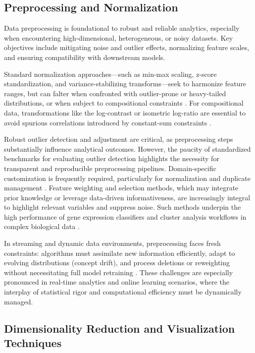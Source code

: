 \subsection{Preprocessing and Normalization}

Data preprocessing is foundational to robust and reliable analytics, especially when encountering high-dimensional, heterogeneous, or noisy datasets. Key objectives include mitigating noise and outlier effects, normalizing feature scales, and ensuring compatibility with downstream models.

Standard normalization approaches—such as min-max scaling, z-score standardization, and variance-stabilizing transforms—seek to harmonize feature ranges, but can falter when confronted with outlier-prone or heavy-tailed distributions, or when subject to compositional constraints \cite{ref60,ref65,ref66,ref67}. For compositional data, transformations like the log-contrast or isometric log-ratio are essential to avoid spurious correlations introduced by constant-sum constraints \cite{ref92,ref95}.

Robust outlier detection and adjustment are critical, as preprocessing steps substantially influence analytical outcomes. However, the paucity of standardized benchmarks for evaluating outlier detection highlights the necessity for transparent and reproducible preprocessing pipelines. Domain-specific customization is frequently required, particularly for normalization and duplicate management \cite{ref73,ref74,ref76,ref77,ref78,ref92,ref95}. Feature weighting and selection methods, which may integrate prior knowledge or leverage data-driven informativeness, are increasingly integral to highlight relevant variables and suppress noise. Such methods underpin the high performance of gene expression classifiers and cluster analysis workflows in complex biological data \cite{ref116}.

In streaming and dynamic data environments, preprocessing faces fresh constraints: algorithms must assimilate new information efficiently, adapt to evolving distributions (concept drift), and process deletions or reweighting without necessitating full model retraining \cite{ref76,ref79,ref80,ref86,ref94}. These challenges are especially pronounced in real-time analytics and online learning scenarios, where the interplay of statistical rigor and computational efficiency must be dynamically managed.

\subsection{Dimensionality Reduction and Visualization Techniques}

